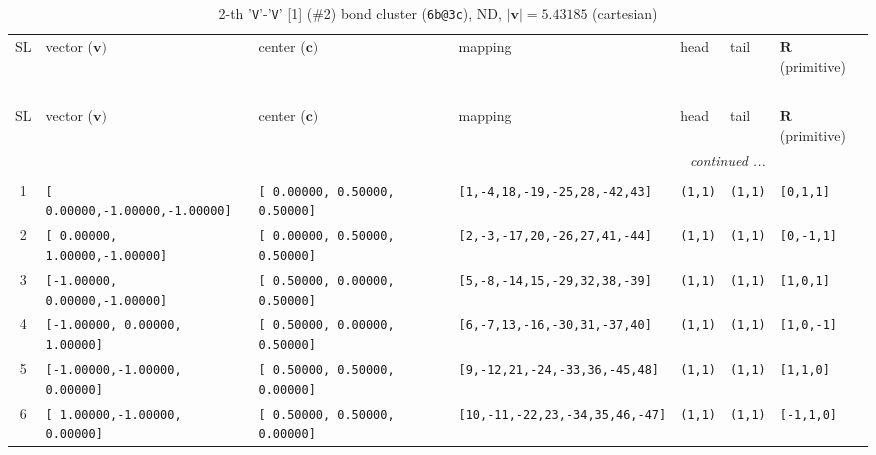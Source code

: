\documentclass[fleqn,10pt,landscape]{jsarticle}
\begin{document}
\begin{longtable}[l]{cllllll}
\captionsetup{justification=raggedright, singlelinecheck=off}
\caption{2-th '\texttt{V}'-'\texttt{V}' [1] (\#2) bond cluster (\texttt{6b@3c}), ND, $|\bm{v}|=5.43185$ (cartesian)}
 \\
 \hline \hline
SL & vector ($\bm{v})$ & center ($\bm{c})$ & mapping & head & tail & $\bm{R}$ (primitive) \\ \hline \endfirsthead

\multicolumn{6}{l}{\tablename\ \thetable{}} \\
 \hline \hline
SL & vector ($\bm{v})$ & center ($\bm{c})$ & mapping & head & tail & $\bm{R}$ (primitive) \\ \hline \endhead

 \hline \hline
\multicolumn{6}{r}{\footnotesize\it continued ...} \\ \endfoot

 \hline \hline
\multicolumn{6}{r}{} \\ \endlastfoot

1 & \texttt{[ 0.00000,-1.00000,-1.00000]} & \texttt{[ 0.00000, 0.50000, 0.50000]} & \texttt{[1,-4,18,-19,-25,28,-42,43]} & \texttt{(1,1)} & \texttt{(1,1)} & \texttt{[0,1,1]} \\ \hline
2 & \texttt{[ 0.00000, 1.00000,-1.00000]} & \texttt{[ 0.00000, 0.50000, 0.50000]} & \texttt{[2,-3,-17,20,-26,27,41,-44]} & \texttt{(1,1)} & \texttt{(1,1)} & \texttt{[0,-1,1]} \\ \hline
3 & \texttt{[-1.00000, 0.00000,-1.00000]} & \texttt{[ 0.50000, 0.00000, 0.50000]} & \texttt{[5,-8,-14,15,-29,32,38,-39]} & \texttt{(1,1)} & \texttt{(1,1)} & \texttt{[1,0,1]} \\ \hline
4 & \texttt{[-1.00000, 0.00000, 1.00000]} & \texttt{[ 0.50000, 0.00000, 0.50000]} & \texttt{[6,-7,13,-16,-30,31,-37,40]} & \texttt{(1,1)} & \texttt{(1,1)} & \texttt{[1,0,-1]} \\ \hline
5 & \texttt{[-1.00000,-1.00000, 0.00000]} & \texttt{[ 0.50000, 0.50000, 0.00000]} & \texttt{[9,-12,21,-24,-33,36,-45,48]} & \texttt{(1,1)} & \texttt{(1,1)} & \texttt{[1,1,0]} \\ \hline
6 & \texttt{[ 1.00000,-1.00000, 0.00000]} & \texttt{[ 0.50000, 0.50000, 0.00000]} & \texttt{[10,-11,-22,23,-34,35,46,-47]} & \texttt{(1,1)} & \texttt{(1,1)} & \texttt{[-1,1,0]} \\
\end{longtable}
\end{document}
